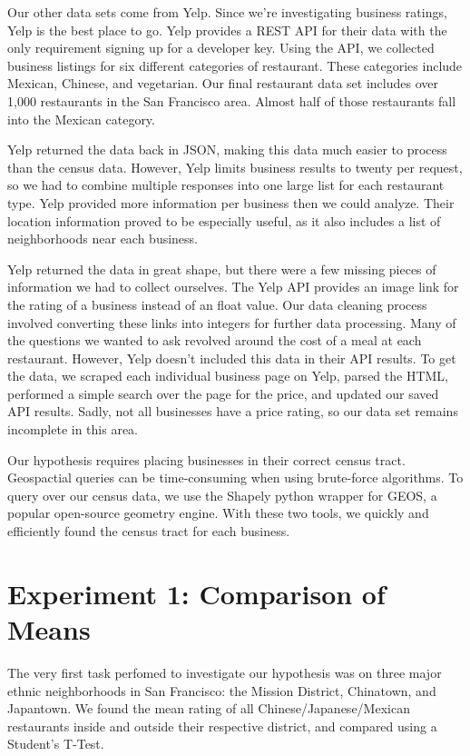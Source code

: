 \documentclass[11pt,twocolumn]{article}
\begin{document}
Our other data sets come from Yelp. Since we're investigating business ratings, Yelp is the best place to go. Yelp provides a REST API for their data with the only requirement signing up for a developer key. Using the API, we collected business listings for six different categories of restaurant. These categories include Mexican, Chinese, and vegetarian. Our final restaurant data set includes over 1,000 restaurants in the San Francisco area. Almost half of those restaurants fall into the Mexican category.

Yelp returned the data back in JSON, making this data much easier to process than the census data. However, Yelp limits business results to twenty per request, so we had to combine multiple responses into one large list for each restaurant type. Yelp provided more information per business then we could analyze. Their location information proved to be especially useful, as it also includes a list of neighborhoods near each business.

Yelp returned the data in great shape, but there were a few missing pieces of information we had to collect ourselves. The Yelp API provides an image link for the rating of a business instead of an float value. Our data cleaning process involved converting these links into integers for further data processing. Many of the questions we wanted to ask revolved around the cost of a meal at each restaurant. However, Yelp doesn't included this data in their API results. To get the data, we scraped each individual business page on Yelp, parsed the HTML, performed a simple search over the page for the price, and updated our saved API results. Sadly, not all businesses have a price rating, so our data set remains incomplete in this area.

Our hypothesis requires placing businesses in their correct census tract. Geospactial queries can be time-consuming when using brute-force algorithms. To query over our census data, we use the Shapely python wrapper for GEOS, a popular open-source geometry engine. With these two tools, we quickly and efficiently found the census tract for each business.

\section{Experiment 1: Comparison of Means}

The very first task perfomed to investigate our hypothesis was on three major ethnic neighborhoods in San Francisco: the Mission District, Chinatown, and Japantown. We  found the mean rating of all Chinese/Japanese/Mexican restaurants inside and outside their respective district, and compared using a Student's T-Test. 
\end{document}
